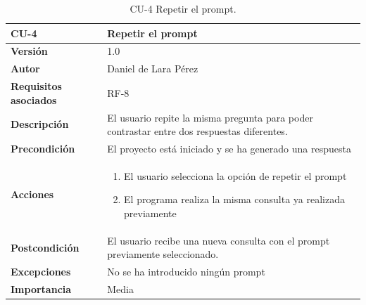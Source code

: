 \begin{table}[p]
	\centering
	\begin{tabularx}{\linewidth}{ p{} p{} }
		\toprule
		\textbf{CU-4}    & \textbf{Repetir el prompt}\\
		\toprule
		\textbf{Versión}              & 1.0    \\
		\textbf{Autor}                & Daniel de Lara Pérez \\
		\textbf{Requisitos asociados} & RF-8 \\
		\textbf{Descripción}          & El usuario repite la misma pregunta para poder contrastar entre dos respuestas diferentes. \\
		\textbf{Precondición}         & El proyecto está iniciado y se ha generado una respuesta \\
		\textbf{Acciones}             &
		\begin{enumerate}
			\def\labelenumi{\arabic{enumi}.}
			\tightlist
			\item El usuario selecciona la opción de repetir el prompt
            \item El programa realiza la misma consulta ya realizada previamente
         
		\end{enumerate}\\
		\textbf{Postcondición}        & El usuario recibe una nueva consulta con el prompt previamente seleccionado. \\
		\textbf{Excepciones}          & No se ha introducido ningún prompt\\
		\textbf{Importancia}          & Media\\
		\bottomrule
	\end{tabularx}
	\caption{CU-4 Repetir el prompt.}
\end{table}

